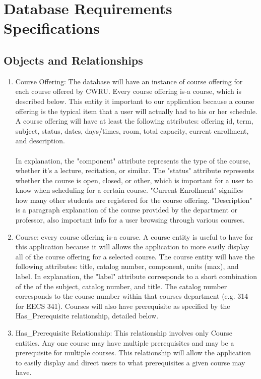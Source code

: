 \documentclass[pdftex,12pt,letter]{article}
\begin{document}
\section{Database Requirements Specifications}
\subsection{Objects and Relationships}
\begin{enumerate}[1.]
\item Course Offering: The database will have an instance of course offering for each course offered by CWRU. Every course offering is-a course, which is described below. This entity it important to our application because a course offering is the typical item that a user will actually had to his or her schedule. A course offering will have at least the following attributes: offering id, term, subject, status, dates, days/times, room, total capacity, current enrollment, and description.\\\\  In explanation, the "component" attribute represents the type of the course, whether it's a lecture, recitation, or similar. The "status" attribute represents whether the course is  open, closed, or other, which is important for a user to know when scheduling for a certain course. "Current Enrollment" signifies how many other students are registered for the course offering. "Description" is a paragraph explanation of the course provided by the department or professor, also important info for a user browsing through various courses.
\item Course: every course offering is-a course. A course entity is useful to have for this application because it will allows the application to more easily display all of the course offering for a selected course. The course entity will have the following attributes: title, catalog number, component, units (max), and label. In explanation, the "label" attribute corresponds to a short combination of the of the subject, catalog number, and title. The catalog number corresponds to the course number within that courses department (e.g. 314 for EECS 341). Courses will also have prerequisite as specified by the Has\_Prerequisite relationship, detailed below.
\item Has\_Prerequisite Relationship: This relationship involves only Course entities. Any one course may have multiple prerequisites and may be a prerequisite for multiple courses. This relationship will allow the application to easily display and direct users to what prerequisites a given course may have.

\end{enumerate}
\end{document}
